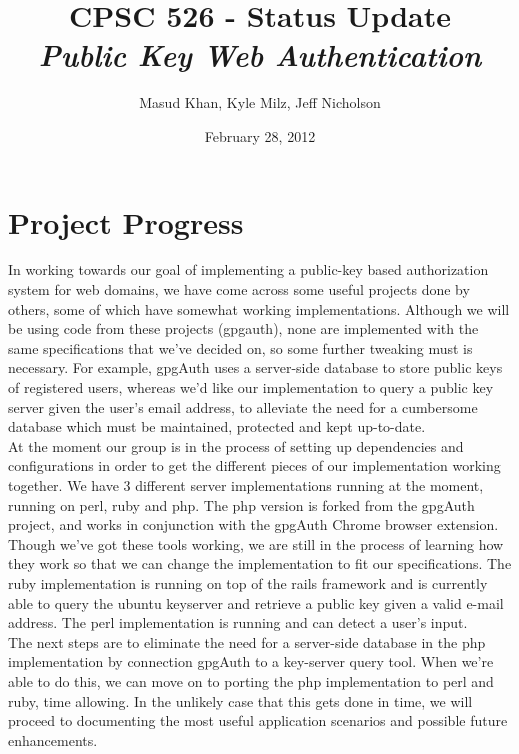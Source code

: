 \documentclass[11pt]{article}
\begin{document}
\title{\bf CPSC 526 - Status Update \\ \emph{Public Key Web Authentication}}
\author{Masud Khan, Kyle Milz, Jeff Nicholson}
\date{February 28, 2012}
\maketitle

\tableofcontents
\pagebreak

\section{Project Progress}
In working towards our goal of implementing a public-key based authorization system for web domains, we have come across some useful projects done by others, some of which have somewhat working implementations.  Although we will be using code from these projects (gpgauth\cite{gpgauth}), none are implemented with the same specifications that we've decided on, so some further tweaking must is necessary.  For example, gpgAuth uses a server-side database to store public keys of registered users, whereas we'd like our implementation to query a public key server given the user's email address, to alleviate the need for a cumbersome database which must be maintained, protected and kept up-to-date.\\
	At the moment our group is in the process of setting up dependencies and configurations in order to get the different pieces of our implementation working together.  We have 3 different server implementations running at the moment, running on perl, ruby and php.  The php version is forked from the gpgAuth project, and works in conjunction with the gpgAuth Chrome browser extension.  Though we've got these tools working, we are still in the process of learning how they work so that we can change the implementation to fit our specifications.  The ruby implementation is running on top of the rails framework and is currently able to query the ubuntu keyserver and retrieve a public key given a valid e-mail address.  The perl implementation is running and can detect a user's input.\\
	The next steps are to eliminate the need for a server-side database in the php implementation by connection gpgAuth to a key-server query tool.  When we're able to do this, we can move on to porting the php implementation to perl and ruby, time allowing.  In the unlikely case that this gets done in time, we will proceed to documenting the most useful application scenarios and possible future enhancements.\\
\end{document}

